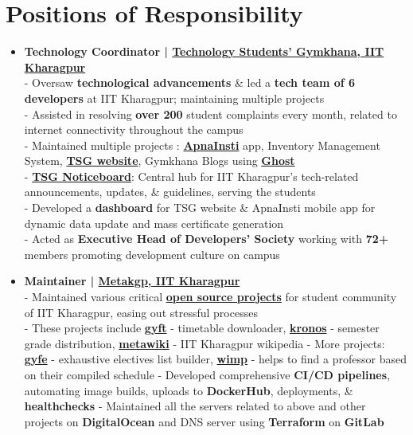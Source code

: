 \documentclass[a4paper,10pt]{extarticle} %
\begin{document}
 \section{\textcolor{primary}{Positions of Responsibility}}
\vspace{+0.2cm}

\begin{itemize}[leftmargin=0.55cm, rightmargin=0.2cm, label={\Large\textbullet}]

\item \textbf{Technology Coordinator | \href{https://gymkhana.iitkgp.ac.in/}{Technology Students' Gymkhana, IIT Kharagpur}}\\
- Oversaw \textbf{technological advancements} \& led a \textbf{tech team of 6 developers} at IIT Kharagpur; maintaining multiple projects \\
- Assisted in resolving \textbf{over 200} student complaints every month, related to internet connectivity throughout the campus \\
- Maintained multiple projects : \href{https://play.google.com/store/apps/details?id=com.apnainsti&pli=1}{\textbf{ApnaInsti}} app, Inventory Management System, \href{https://gymkhana.iitkgp.ac.in/}{\textbf{TSG website}}, Gymkhana Blogs using \href{https://ghost.org/}{\textbf{Ghost}} \\
- \href{https://github.com/tsg-iitkgp/noticeboard}{\textbf{TSG Noticeboard}}: Central hub for IIT Kharagpur's tech-related announcements, updates, \& guidelines, serving the students \\
- Developed a \textbf{dashboard} for TSG website \& ApnaInsti mobile app for dynamic data update and mass certificate generation \\
- Acted as \textbf{Executive Head of Developers' Society} working with \textbf{72+} members promoting development culture on campus

\item \textbf{Maintainer | \href{https://metakgp.org/}{Metakgp, IIT Kharagpur}}\\
- Maintained various critical \href{https://github.com/metakgp}{\textbf{open source projects}} for student community of IIT Kharagpur, easing out stressful processes \\
- These projects include \href{https://github.com/metakgp/gyft}{\textbf{gyft}} - timetable downloader, \href{http://kronos.streamlit.app}{\textbf{kronos}} - semester grade distribution, \href{https://wiki.metakgp.org}{\textbf{metawiki}} - IIT Kharagpur wikipedia \newline
- More projects: \href{https://gyfe.metakgp.org}{\textbf{gyfe}} - exhaustive electives list builder, \href{https://github.com/metakgp/wimp}{\textbf{wimp}} - helps to find a professor based on their compiled schedule \newline
- Developed comprehensive \textbf{CI/CD pipelines}, automating image builds, uploads to \textbf{DockerHub}, deployments, \& \textbf{healthchecks} \newline
- Maintained all the servers related to above and other projects on \textbf{DigitalOcean} and DNS server using \textbf{Terraform} on \textbf{GitLab}


\end{itemize}
\end{document}
